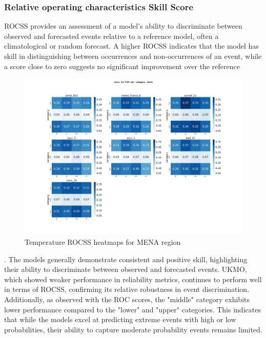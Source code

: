 \subsubsection{Relative operating characteristics Skill Score}
ROCSS provides an assessment of a model's ability to discriminate between observed and forecasted events relative to a reference model, often a climatological or random forecast. A higher ROCSS indicates that the model has skill in distinguishing between occurrences and non-occurrences of an event, while a score close to zero suggests no significant improvement over the reference

\begin{figure}[H]
    \centering
    \includegraphics[width=1\linewidth]{plots/prob/rocss/rocss_T2M_category_mena.png}
    \caption{Temperature ROCSS  heatmaps for MENA region }
    \label{fig:CORR_djf_t2m}
\end{figure}. 
The models generally demonstrate consistent and positive skill, highlighting their ability to discriminate between observed and forecasted events. UKMO, which showed weaker performance in reliability metrics, continues to perform well in terms of ROCSS, confirming its relative robustness in event discrimination. Additionally, as observed with the ROC scores, the "middle" category exhibits lower performance compared to the "lower" and "upper" categories. This indicates that while the models excel at predicting extreme events with high or low probabilities, their ability to capture moderate probability events remains limited.








